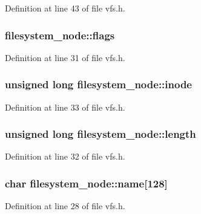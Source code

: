 Definition at line 43 of file vfs.h.

\hypertarget{structfilesystem__node_a99cca728c467d0996145533ebb1b7d6b}{
\subsubsection[{flags}]{ {\bf filesystem\_\-node::flags}}}
\label{structfilesystem__node_a99cca728c467d0996145533ebb1b7d6b}


Definition at line 31 of file vfs.h.

\hypertarget{structfilesystem__node_a4bd1dd0eb66e269e50dc84b4700d153d}{
\subsubsection[{inode}]{\setlength{\rightskip}{0pt plus 5cm}unsigned long {\bf filesystem\_\-node::inode}}}
\label{structfilesystem__node_a4bd1dd0eb66e269e50dc84b4700d153d}


Definition at line 33 of file vfs.h.

\hypertarget{structfilesystem__node_a4d273cc3bb51e987b660ec3e5389389a}{
\subsubsection[{length}]{\setlength{\rightskip}{0pt plus 5cm}unsigned long {\bf filesystem\_\-node::length}}}
\label{structfilesystem__node_a4d273cc3bb51e987b660ec3e5389389a}


Definition at line 32 of file vfs.h.

\hypertarget{structfilesystem__node_afa5e9c7fb847e9afe73997d69e961346}{
\subsubsection[{name}]{\setlength{\rightskip}{0pt plus 5cm}char {\bf filesystem\_\-node::name}\mbox{[}128\mbox{]}}}
\label{structfilesystem__node_afa5e9c7fb847e9afe73997d69e961346}


Definition at line 28 of file vfs.h.

